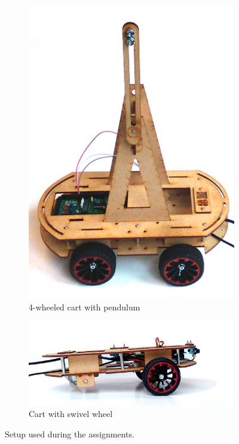 \documentclass[10pt,a4paper]{article}
\begin{document}
\begin{figure}[h]
  \centering
  \begin{subfigure}[c]{0.46\columnwidth}
    \centering
    \includegraphics[scale=0.1]{figures/pendulum.jpg}
    \caption{4-wheeled cart with pendulum}
  \end{subfigure}
  \begin{subfigure}[c]{0.46\columnwidth}
    \centering
    \includegraphics[scale=0.4]{figures/swivel.jpg}
    \caption{Cart with swivel wheel}
  \end{subfigure}
\caption{Setup used during the assignments.}
\label{fig:cart}
\end{figure}
\end{document}
